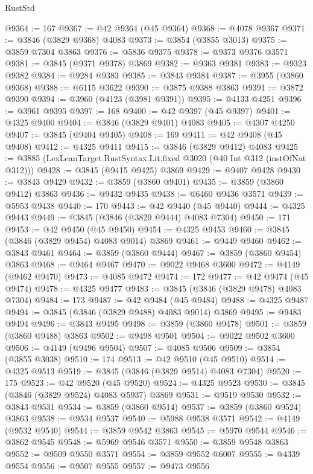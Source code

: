 \begin{lexlean}{RustStd}
\begin{coremodule}
@9364 := 167
@9367 := @42 @9364 (@45 @9364)
@9368 := @4078 @9367
@9371 := @3846 (@3829 @9368) @4083
@9373 := @3854 (@3855 @3013)
@9375 := @3859 @7304 @3863
@9376 := @5836 @9375
@9378 := @9373 @9376 @3571
@9381 := @3845 (@9371 @9378) @3869
@9382 := @9363 @9381
@9383 := @9323 @9382
@9384 := @9284 @9383
@9385 := @3843 @9384
@9387 := @3955 (@3860 @9368)
@9388 := @6115 @3622
@9390 := @3875 @9388 @3863
@9391 := @3872 @9390
@9394 := @3960 (@4123 (@3981 @9391))
@9395 := @4133 @4251
@9396 := @3961 @9395
@9397 := 168
@9400 := @42 @9397 (@45 @9397)
@9401 := @4325 @9400
@9404 := @3846 (@3829 @9401) @4083
@9405 := @4307 @4250
@9407 := @3845 (@9404 @9405)
@9408 := 169
@9411 := @42 @9408 (@45 @9408)
@9412 := @4325 @9411
@9415 := @3846 (@3829 @9412) @4083
@9425 := @3885 (LexLeanTarget.RustSyntax.Lit.fixed @3020 (@40 Int @312 (instOfNat @312)))
@9428 := @3845 (@9415 @9425) @3869
@9429 := @9407 @9428
@9430 := @3843 @9429
@9432 := @3859 (@3860 @9401)
@9435 := @3859 (@3860 @9412) @3863
@9436 := @9432 @9435
@9438 := @6460 @9436 @3571
@9439 := @5953 @9438
@9440 := 170
@9443 := @42 @9440 (@45 @9440)
@9444 := @4325 @9443
@9449 := @3845 (@3846 (@3829 @9444) @4083 @7304)
@9450 := 171
@9453 := @42 @9450 (@45 @9450)
@9454 := @4325 @9453
@9460 := @3845 (@3846 (@3829 @9454) @4083 @9014) @3869
@9461 := @9449 @9460
@9462 := @3843 @9461
@9464 := @3859 (@3860 @9444)
@9467 := @3859 (@3860 @9454) @3863
@9468 := @9464 @9467
@9470 := @9022 @9468 @3600
@9472 := @4149 (@9462 @9470)
@9473 := @4085 @9472
@9474 := 172
@9477 := @42 @9474 (@45 @9474)
@9478 := @4325 @9477
@9483 := @3845 (@3846 (@3829 @9478) @4083 @7304)
@9484 := 173
@9487 := @42 @9484 (@45 @9484)
@9488 := @4325 @9487
@9494 := @3845 (@3846 (@3829 @9488) @4083 @9014) @3869
@9495 := @9483 @9494
@9496 := @3843 @9495
@9498 := @3859 (@3860 @9478)
@9501 := @3859 (@3860 @9488) @3863
@9502 := @9498 @9501
@9504 := @9022 @9502 @3600
@9506 := @4149 (@9496 @9504)
@9507 := @4085 @9506
@9509 := @3854 (@3855 @3038)
@9510 := 174
@9513 := @42 @9510 (@45 @9510)
@9514 := @4325 @9513
@9519 := @3845 (@3846 (@3829 @9514) @4083 @7304)
@9520 := 175
@9523 := @42 @9520 (@45 @9520)
@9524 := @4325 @9523
@9530 := @3845 (@3846 (@3829 @9524) @4083 @5937) @3869
@9531 := @9519 @9530
@9532 := @3843 @9531
@9534 := @3859 (@3860 @9514)
@9537 := @3859 (@3860 @9524) @3863
@9538 := @9534 @9537
@9540 := @5988 @9538 @3571
@9542 := @4149 (@9532 @9540)
@9544 := @3859 @9542 @3863
@9545 := @5970 @9544
@9546 := @3862 @9545
@9548 := @5969 @9546 @3571
@9550 := @3859 @9548 @3863
@9552 := @9509 @9550 @3571
@9554 := @3859 @9552 @6007
@9555 := @4339 @9554
@9556 := @9507 @9555
@9557 := @9473 @9556

\end{coremodule}
\end{lexlean}
